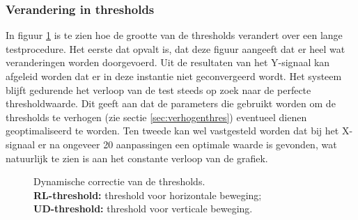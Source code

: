 \documentclass{article}
\newcommand{\figwidth}{0.82\linewidth}
\begin{document}
\subsubsection*{Verandering in thresholds}
In figuur \ref{fig:resthresholds} is te zien hoe de grootte van de thresholds verandert over een lange testprocedure. Het eerste dat opvalt is, dat deze figuur aangeeft dat er heel wat veranderingen worden doorgevoerd. Uit de resultaten van het Y-signaal kan afgeleid worden dat er in deze instantie niet geconvergeerd wordt. Het systeem blijft gedurende het verloop van de test steeds op zoek naar de perfecte thresholdwaarde. Dit geeft aan dat de parameters die gebruikt worden om de thresholds te verhogen (zie sectie \ref{sec:verhogenthres})  eventueel dienen geoptimaliseerd te worden. Ten tweede kan wel vastgesteld worden dat bij het X-signaal er na ongeveer 20 aanpassingen een optimale waarde is gevonden, wat natuurlijk te zien is aan het constante verloop van de grafiek.
\begin{figure}[H]
	\centering
	\caption{Dynamische correctie van de thresholds.\\\textbf{RL-threshold:} threshold voor horizontale beweging;\\\textbf{UD-threshold:} threshold voor verticale beweging.}
	\label{fig:resthresholds}
\end{figure}
\end{document}
